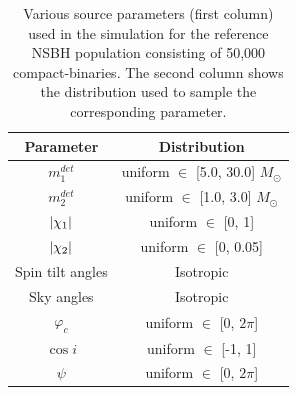 \begin{table}[]
    \centering
    \begin{tabular}{c|c}
        Parameter &  Distribution\\
        \hline
        \hline
        $ m_{1}^{det} $ & uniform $\in$ [5.0, 30.0]  $ M_{\odot}$ \\
        \hline
        $ m_{2}^{det} $ & uniform $\in$ [1.0, 3.0] $ M_{\odot} $\\
        \hline 
        $\abs{\chi_{1}}$ & uniform $\in$ [0, 1] \\
        \hline
        $\abs{\chi_{2}}$ & uniform $\in$ [0, 0.05] \\
        \hline
        Spin tilt angles & Isotropic\\
        \hline 
        Sky angles & Isotropic \\
        \hline
        $\varphi_c$ & uniform $\in$ [0, $2\pi$]\\
        \hline
        $\cos{i}$ & uniform $\in$ [-1, 1] \\
        \hline
        $\psi$ & uniform $\in$ [0, $2\pi$]
    \end{tabular}
    \caption{ Various source parameters (first column) used in the simulation for the reference NSBH population consisting of 50,000 compact-binaries. The second column shows the distribution used to sample the corresponding parameter.}
    \label{tab:priors}
\end{table}

\section{}